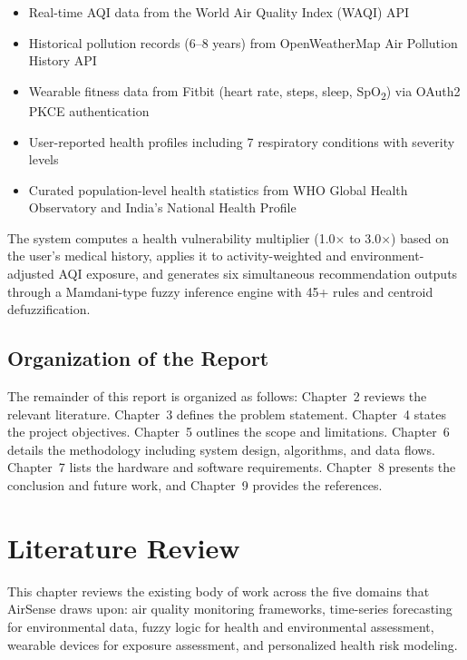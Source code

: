 \documentclass[12pt,a4paper]{report}
\begin{document}
\begin{itemize}[leftmargin=*]
  \item Real-time AQI data from the World Air Quality Index (WAQI) API
  \item Historical pollution records (6--8 years) from OpenWeatherMap Air Pollution History API
  \item Wearable fitness data from Fitbit (heart rate, steps, sleep, SpO\textsubscript{2}) via OAuth2 PKCE authentication
  \item User-reported health profiles including 7 respiratory conditions with severity levels
  \item Curated population-level health statistics from WHO Global Health Observatory and India's National Health Profile
\end{itemize}

The system computes a health vulnerability multiplier (1.0$\times$ to 3.0$\times$) based on the user's medical history, applies it to activity-weighted and environment-adjusted AQI exposure, and generates six simultaneous recommendation outputs through a Mamdani-type fuzzy inference engine with 45+ rules and centroid defuzzification.

\section{Organization of the Report}

The remainder of this report is organized as follows: Chapter~2 reviews the relevant literature. Chapter~3 defines the problem statement. Chapter~4 states the project objectives. Chapter~5 outlines the scope and limitations. Chapter~6 details the methodology including system design, algorithms, and data flows. Chapter~7 lists the hardware and software requirements. Chapter~8 presents the conclusion and future work, and Chapter~9 provides the references.


\chapter{Literature Review}

This chapter reviews the existing body of work across the five domains that AirSense draws upon: air quality monitoring frameworks, time-series forecasting for environmental data, fuzzy logic for health and environmental assessment, wearable devices for exposure assessment, and personalized health risk modeling.
\end{document}
